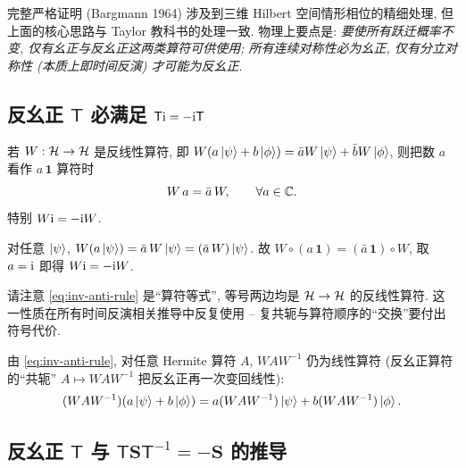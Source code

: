 \begin{remark}
完整严格证明 (Bargmann 1964) 涉及到三维 Hilbert 空间情形相位的精细处理, 但上面的核心思路与 Taylor 教科书的处理一致. 物理上要点是: \emph{要使所有跃迁概率不变, 仅有幺正与反幺正这两类算符可供使用; 所有连续对称性必为幺正, 仅有分立对称性 (本质上即时间反演) 才可能为反幺正}.
\end{remark}


\subsection{反幺正 \texorpdfstring{$\mathsf{T}$}{T} 必满足 \texorpdfstring{$\mathsf{T}\mathrm{i}=-\mathrm{i}\mathsf{T}$}{Ti = -iT}}\label{sec:inv-Ti}

\begin{proposition}\label{prop:inv-anti}
若 $W:\mathcal{H}\to \mathcal{H}$ 是反线性算符, 即 $W(a\ket{\psi}+b\ket{\phi})=\bar{a}W\ket{\psi}+\bar{b}W\ket{\phi}$, 则把数 $a$ 看作 $a\,\mathbf{1}$ 算符时
\begin{equation}\label{eq:inv-anti-rule}
W\,a = \bar{a}\,W,\qquad \forall a\in \mathbb{C}.
\end{equation}
特别 $W\mathrm{i} = -\mathrm{i} W$.
\end{proposition}

\begin{proof*}
对任意 $\ket{\psi}$, $W(a\ket{\psi}) = \bar{a}\,W\ket{\psi}=(\bar{a}\,W)\ket{\psi}$. 故 $W\circ (a\,\mathbf{1})=(\bar{a}\,\mathbf{1})\circ W$, 取 $a=\mathrm{i}$ 即得 $W\mathrm{i}=-\mathrm{i} W$.
\end{proof*}

\begin{remark}
请注意 \eqref{eq:inv-anti-rule} 是``算符等式'', 等号两边均是 $\mathcal{H}\to \mathcal{H}$ 的反线性算符. 这一性质在所有时间反演相关推导中反复使用 -- 复共轭与算符顺序的``交换''要付出符号代价.
\end{remark}

由 \eqref{eq:inv-anti-rule}, 对任意 Hermite 算符 $A$, $W A W^{-1}$ 仍为线性算符 (反幺正算符的``共轭'' $A\mapsto W A W^{-1}$ 把反幺正再一次变回线性):
\begin{equation}\label{eq:inv-WAW}
(W A W^{-1})(a\ket{\psi}+b\ket{\phi}) = a (W A W^{-1})\ket{\psi}+b(W A W^{-1})\ket{\phi}.
\end{equation}


\subsection{反幺正 \texorpdfstring{$\mathsf{T}$}{T} 与 \texorpdfstring{$\mathsf{T}\bm{S}\mathsf{T}^{-1}=-\bm{S}$}{T S Tinv = -S} 的推导}\label{sec:inv-TST}

